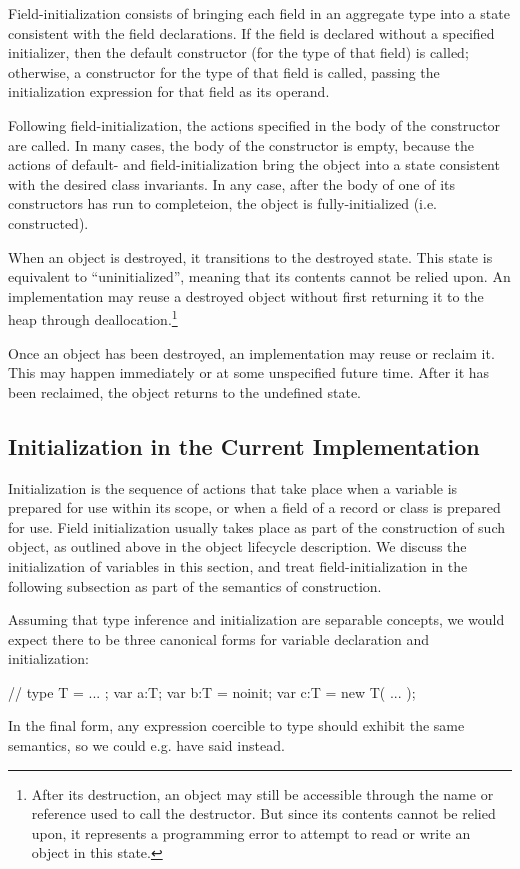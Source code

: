 Field-initialization consists of bringing each field in an aggregate type into a
state consistent with the field declarations.  If the field is declared without
a specified initializer, then the default constructor (for the type of that
field) is called; otherwise, a constructor for the type of that field is called,
passing the initialization expression for that field as its operand.

Following field-initialization, the actions specified in the body of the
constructor are called.  In many cases, the body of the constructor is empty,
because the actions of default- and field-initialization bring the object into a
state consistent with the desired class invariants.  In any case, after the body
of one of its constructors has run to completeion, the object is
fully-initialized (i.e. constructed).

When an object is destroyed, it transitions to the destroyed state.  This state
is equivalent to ``uninitialized'', meaning that its contents cannot be relied
upon.  An implementation may reuse a destroyed object without first returning it
to the heap through deallocation.\footnote{After its destruction, an object may
  still be accessible through the name or reference used to call the
  destructor.  But since its contents cannot be relied upon, it represents a
  programming error to attempt to read or write an object in this state.}

Once an object has been destroyed, an implementation may reuse or reclaim it.
This may happen immediately or at some unspecified future time.  After it has
been reclaimed, the object returns to the undefined state.


\subsection{Initialization in the Current Implementation}

Initialization is the sequence of actions that take place when a variable is prepared for
use within its scope, or when a field of a record or class is prepared for use.  Field
initialization usually takes place as part of the construction of such object, as outlined
above in the object lifecycle description.  We discuss the initialization of variables in
this section, and treat field-initialization in the following subsection as part of the
semantics of construction. 

Assuming that type inference and initialization are separable concepts, we would expect
there to be three canonical forms for variable declaration and initialization:
\begin{chapel}
// type T = ... ;
   var a:T;
   var b:T = noinit;
   var c:T = new T( ... );
\end{chapel}
In the final form, any expression coercible to type  should exhibit the same
semantics, so we could e.g. have said  instead.

